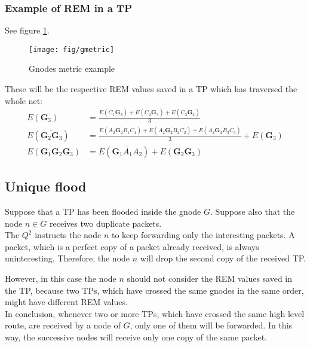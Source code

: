 \documentclass[a4paper]{article}
\begin{document}
\subsubsection*{Example of REM in a TP}
See figure \ref{fig:gmetric}.
\begin{figure}[h]
	\begin{center}
		\texttt{[image: fig/gmetric]}
	\end{center}
	\caption{Gnodes metric example}
	\label{fig:gmetric}
\end{figure}

These will be the respective REM values saved in a TP which has traversed the
whole net:
\begin{align*}
	E(\mathbf{G}_3)&=\frac{E(\overline{C_1 \mathbf{G}_3})+E(\overline{C_2 \mathbf{G}_3})
	+E(\overline{C_3 \mathbf{G}_3})}{3} \\ 
	E(\overline{\mathbf{G}_2\mathbf{G}_3})&=
	\frac{
		E(\overline{A_2 \mathbf{\mathbf{G}}_2  B_1 C_1})+
		E(\overline{A_2 \mathbf{\mathbf{G}}_2  B_2 C_2})+
		E(\overline{A_2 \mathbf{\mathbf{G}}_2  B_3 C_3})
	     }{3} + 
	     E(\mathbf{\mathbf{G}}_3)\\
	E(\mathbf{G}_1\mathbf{G}_2\mathbf{G}_3)&= 
		E(\overline{\mathbf{\mathbf{G}}_1 A_1 A_2})+
		E(\mathbf{G}_2\mathbf{G}_3)
\end{align*}

\subsection{Unique flood}
Suppose that a TP has been flooded inside the gnode $G$.
Suppose also that the node $n \in G$ receives two duplicate packets.\\
The $Q^2$ instructs the node $n$ to keep forwarding only the interesting packets.
A packet, which is a perfect copy of a packet already received, is always
uninteresting. Therefore, the node $n$ will drop the second copy of the
received TP. 

However, in this case the node $n$ should not consider the REM
values saved in the TP, because two TPs, which have crossed the same
gnodes in the same order, might have different REM values.
\\

In conclusion, whenever two or more TPs, which have crossed the same high level
route, are received by a node of $G$, only one of them will be forwarded. In
this way, the successive nodes will receive only one copy of the same packet.


\end{document}
